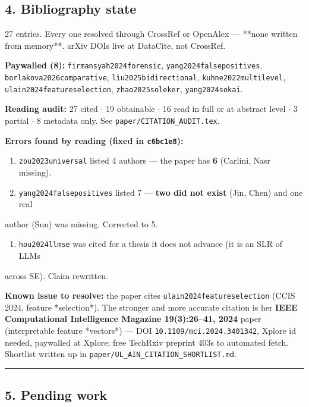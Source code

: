 \documentclass[10pt,a4paper]{article}
\begin{document}
\subsection*{4. Bibliography state}

27 entries. Every one resolved through CrossRef or OpenAlex --- **none written
from memory**. arXiv DOIs live at DataCite, not CrossRef.

\textbf{Paywalled (8):} \texttt{firmansyah2024forensic}, \texttt{yang2024falsepositives},
\texttt{borlakova2026comparative}, \texttt{liu2025bidirectional}, \texttt{kuhne2022multilevel},
\texttt{ulain2024featureselection}, \texttt{zhao2025soleker}, \texttt{yang2024sokai}.

\textbf{Reading audit:} 27 cited $\cdot$ 19 obtainable $\cdot$ 16 read in full or at abstract
level $\cdot$ 3 partial $\cdot$ 8 metadata only. See \texttt{paper/CITATION\_AUDIT.tex}.

\textbf{Errors found by reading (fixed in \texttt{c6bc1e8}):}
\begin{enumerate}
\item \texttt{zou2023universal} listed 4 authors --- the paper has \textbf{6} (Carlini, Nasr missing).
\item \texttt{yang2024falsepositives} listed 7 --- \textbf{two did not exist} (Jin, Chen) and one real
\end{enumerate}
   author (Sun) was missing. Corrected to 5.
\begin{enumerate}
\item \texttt{hou2024llmse} was cited for a thesis it does not advance (it is an SLR of LLMs
\end{enumerate}
   across SE). Claim rewritten.

\textbf{Known issue to resolve:} the paper cites \texttt{ulain2024featureselection} (CCIS 2024,
feature *selection*). The stronger and more accurate citation is her
\textbf{IEEE Computational Intelligence Magazine 19(3):26–41, 2024} paper
(interpretable feature *vectors*) --- DOI \texttt{10.1109/mci.2024.3401342}, Xplore id
needed, paywalled at Xplore; free TechRxiv preprint 403s to automated fetch.
Shortlist written up in \texttt{paper/UL\_AIN\_CITATION\_SHORTLIST.md}.

\vspace{3pt}\hrule\vspace{5pt}

\subsection*{5. Pending work}
\end{document}
